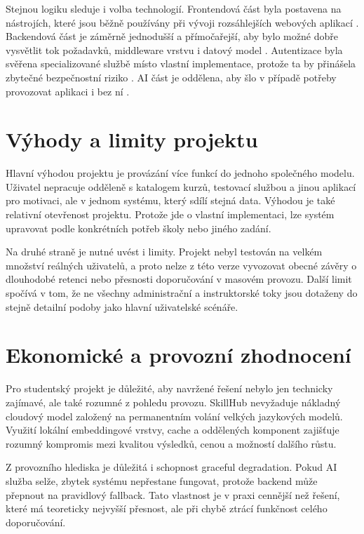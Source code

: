 \documentclass[12pt,a4paper]{report}
\begin{document}
Stejnou logiku sleduje i volba technologií. Frontendová část byla postavena na nástrojích, které jsou běžně používány při vývoji rozsáhlejších webových aplikací \cite{next,react}. Backendová část je záměrně jednodušší a přímočařejší, aby bylo možné dobře vysvětlit tok požadavků, middleware vrstvu i datový model \cite{express,prisma}. Autentizace byla svěřena specializované službě místo vlastní implementace, protože ta by přinášela zbytečné bezpečnostní riziko \cite{supabase,owasp}. AI část je oddělena, aby šlo v případě potřeby provozovat aplikaci i bez ní \cite{fastapi,reimers}.

\section{Výhody a limity projektu}
Hlavní výhodou projektu je provázání více funkcí do jednoho společného modelu. Uživatel nepracuje odděleně s katalogem kurzů, testovací službou a jinou aplikací pro motivaci, ale v jednom systému, který sdílí stejná data. Výhodou je také relativní otevřenost projektu. Protože jde o vlastní implementaci, lze systém upravovat podle konkrétních potřeb školy nebo jiného zadání.

Na druhé straně je nutné uvést i limity. Projekt nebyl testován na velkém množství reálných uživatelů, a proto nelze z této verze vyvozovat obecné závěry o dlouhodobé retenci nebo přesnosti doporučování v masovém provozu. Další limit spočívá v tom, že ne všechny administrační a instruktorské toky jsou dotaženy do stejně detailní podoby jako hlavní uživatelské scénáře.

\section{Ekonomické a provozní zhodnocení}
Pro studentský projekt je důležité, aby navržené řešení nebylo jen technicky zajímavé, ale také rozumné z pohledu provozu. SkillHub nevyžaduje nákladný cloudový model založený na permanentním volání velkých jazykových modelů. Využití lokální embeddingové vrstvy, cache a oddělených komponent zajišťuje rozumný kompromis mezi kvalitou výsledků, cenou a možností dalšího růstu.

Z provozního hlediska je důležitá i schopnost graceful degradation. Pokud AI služba selže, zbytek systému nepřestane fungovat, protože backend může přepnout na pravidlový fallback. Tato vlastnost je v praxi cennější než řešení, které má teoreticky nejvyšší přesnost, ale při chybě ztrácí funkčnost celého doporučování.
\end{document}
